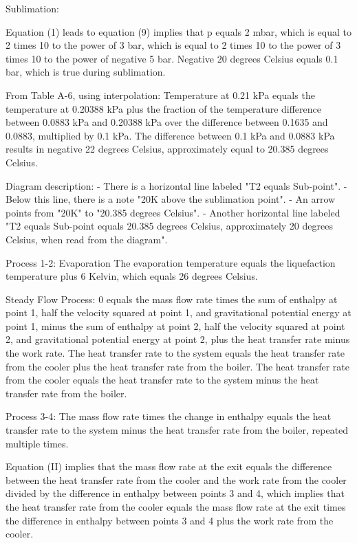 Sublimation:

Equation (1) leads to equation (9) implies that p equals 2 mbar, which is equal to 2 times 10 to the power of 3 bar, which is equal to 2 times 10 to the power of 3 times 10 to the power of negative 5 bar. Negative 20 degrees Celsius equals 0.1 bar, which is true during sublimation.

From Table A-6, using interpolation:
Temperature at 0.21 kPa equals the temperature at 0.20388 kPa plus the fraction of the temperature difference between 0.0883 kPa and 0.20388 kPa over the difference between 0.1635 and 0.0883, multiplied by 0.1 kPa. The difference between 0.1 kPa and 0.0883 kPa results in negative 22 degrees Celsius, approximately equal to 20.385 degrees Celsius.

Diagram description:
- There is a horizontal line labeled "T2 equals Sub-point".
- Below this line, there is a note "20K above the sublimation point".
- An arrow points from "20K" to "20.385 degrees Celsius".
- Another horizontal line labeled "T2 equals Sub-point equals 20.385 degrees Celsius, approximately 20 degrees Celsius, when read from the diagram".

Process 1-2: Evaporation
The evaporation temperature equals the liquefaction temperature plus 6 Kelvin, which equals 26 degrees Celsius.

Steady Flow Process:
0 equals the mass flow rate times the sum of enthalpy at point 1, half the velocity squared at point 1, and gravitational potential energy at point 1, minus the sum of enthalpy at point 2, half the velocity squared at point 2, and gravitational potential energy at point 2, plus the heat transfer rate minus the work rate. The heat transfer rate to the system equals the heat transfer rate from the cooler plus the heat transfer rate from the boiler. The heat transfer rate from the cooler equals the heat transfer rate to the system minus the heat transfer rate from the boiler.

Process 3-4:
The mass flow rate times the change in enthalpy equals the heat transfer rate to the system minus the heat transfer rate from the boiler, repeated multiple times.

Equation (II) implies that the mass flow rate at the exit equals the difference between the heat transfer rate from the cooler and the work rate from the cooler divided by the difference in enthalpy between points 3 and 4, which implies that the heat transfer rate from the cooler equals the mass flow rate at the exit times the difference in enthalpy between points 3 and 4 plus the work rate from the cooler.

